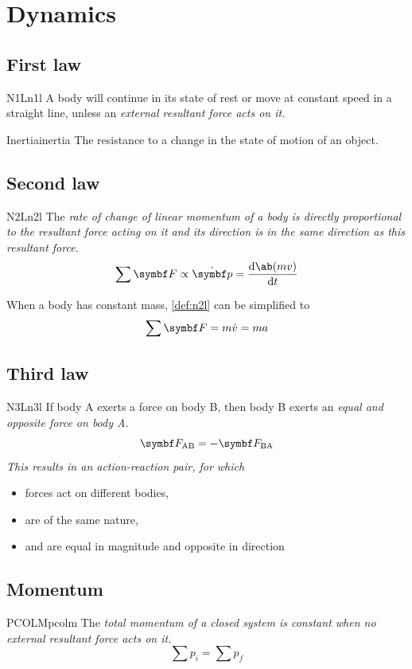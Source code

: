 \chapter{Dynamics}
\section{First law}
\begin{definition}{N1L}{n1l}
	A body will continue in its state of rest or move at constant speed in a straight line,
	unless an \it{external resultant force} acts on it.
\end{definition}
\begin{definition}{Inertia}{inertia}
	The resistance to a change in the state of motion of an object.
\end{definition}
\section{Second law}
\begin{definition}{N2L}{n2l}
	The \it{rate of change of linear momentum} of a body is \it{directly proportional to the resultant force} acting on it
	and its direction is in the \it{same direction} as this resultant force.
	\[\sum \va{F} \propto \dot{\va{p}} = \odv{\ab(mv)}{t}\]
\end{definition}
When a body has constant mass, \cref{def:n2l} can be simplified to
\begin{equation*}
	\sum \va{F} = m\dot{v} = ma
	\label{eq:n2l}
\end{equation*}
\section{Third law}
\begin{definition}{N3L}{n3l}
	If body A exerts a force on body B, then body B exerts an \it{equal and opposite} force on body A.
	\[\va{F}_\text{AB} = -\va{F}_\text{BA}\]
	This results in an action-reaction pair, for which
	\begin{itemize}
		\item forces act on different bodies,
		\item are of the same nature,
		\item and are equal in magnitude and opposite in direction
	\end{itemize}
\end{definition}
\section{Momentum}
\begin{definition}{PCOLM}{pcolm}
	The \it{total momentum} of a closed system is constant when no external resultant force acts on it.
	\[\sum p_i = \sum p_f\]
\end{definition}

